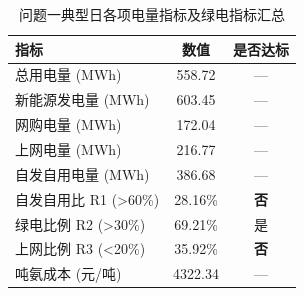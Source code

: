 \begin{table}[H]
\centering
\caption{问题一典型日各项电量指标及绿电指标汇总}
\begin{tabular}{lcc}
\toprule
指标 & 数值 & 是否达标 \\
\midrule
总用电量 (MWh) & 558.72 & — \\
新能源发电量 (MWh) & 603.45 & — \\
网购电量 (MWh) & 172.04 & — \\
上网电量 (MWh) & 216.77 & — \\
自发自用电量 (MWh) & 386.68 & — \\
\midrule
自发自用比 R1 (>60\%) & 28.16\% & \textbf{否} \\
绿电比例 R2 (>30\%) & 69.21\% & 是 \\
上网比例 R3 (<20\%) & 35.92\% & \textbf{否} \\
吨氨成本 (元/吨) & 4322.34 & — \\
\bottomrule
\end{tabular}
\end{table}